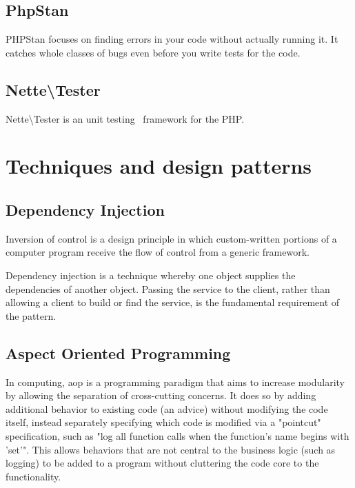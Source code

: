 \tocless\subsection{PhpStan} \label{sec:theory:phpstan}

PHPStan focuses on finding errors in your code without actually running it. It catches whole classes of bugs even before you write tests for the code.~\cite{github:phpstan}

\tocless\subsection{Nette\textbackslash{}Tester} \label{sec:theory:nette-tester}

Nette\textbackslash{}Tester is an unit testing~\cite{wiki:unit-testing} framework for the PHP.~\cite{tester:docs}

\section{Techniques and design patterns}

\tocless\subsection{Dependency Injection} \label{sec:theory:di}

Inversion of control is a design principle in which custom-written portions of a computer program receive the flow of control from a generic framework.

Dependency injection is a technique whereby one object supplies the dependencies of another object. Passing the service to the client, rather than allowing a client to build or find the service, is the fundamental requirement of the pattern.~\cite{fowler:di}

\tocless\subsection{Aspect Oriented Programming} \label{sec:theory:aop}

In computing, \gls{aop} is a programming paradigm that aims to increase modularity by allowing the separation of cross-cutting concerns. It does so by adding additional behavior to existing code (an advice) without modifying the code itself, instead separately specifying which code is modified via a "pointcut" specification, such as "log all function calls when the function's name begins with 'set'". This allows behaviors that are not central to the business logic (such as logging) to be added to a program without cluttering the code core to the functionality.~\cite{wiki:aop}

